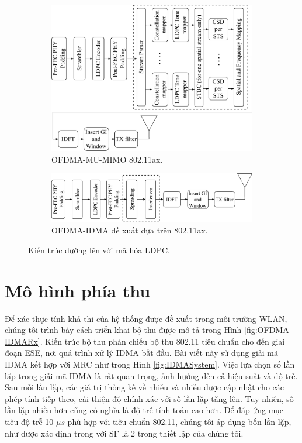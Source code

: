 \begin{figure}
	\centering
	\begin{subfigure}{0.49\linewidth}
		\centering
		\includegraphics[width=1.2\linewidth, angle = -90]{figure/chap3/MU-MIMOTx_k2opt.pdf}
		\caption{OFDMA-MU-MIMO 802.11ax.}
		\label{fig:Old-OFDMA-MU-MIMO}
	\end{subfigure}
	\vspace{1em}
	\begin{subfigure}{0.49\linewidth}
		\centering
		\includegraphics[width=\linewidth, angle = -90]{figure/chap3/IDMA_Tx_Rx_structure-Trang-4_k2opt.pdf}
		\caption{OFDMA-IDMA đề xuất dựa trên 802.11ax.}
		\label{fig:Proposed_OFDMA-IDMA}
	\end{subfigure}

	\caption{Kiến trúc đường lên với mã hóa LDPC.}
	\label{fig:Transmitter}
\end{figure}
\section{Mô hình phía thu}

Để xác thực tính khả thi của hệ thống được đề xuất trong môi trường WLAN, chúng tôi trình bày cách triển khai bộ thu được mô tả trong Hình \ref{fig:OFDMA-IDMARx}. Kiến trúc bộ thu phản chiếu bộ thu 802.11 tiêu chuẩn cho đến giai đoạn ESE, nơi quá trình xử lý IDMA bắt đầu. Bài viết này sử dụng giải mã IDMA kết hợp với MRC như trong Hình \ref{fig:IDMASystem}. Việc lựa chọn số lần lặp trong giải mã IDMA là rất quan trọng, ảnh hưởng đến cả hiệu suất và độ trễ. Sau mỗi lần lặp, các giá trị thống kê về nhiễu và nhiễu được cập nhật cho các phép tính tiếp theo, cải thiện độ chính xác với số lần lặp tăng lên. Tuy nhiên, số lần lặp nhiều hơn cũng có nghĩa là độ trễ tính toán cao hơn. Để đáp ứng mục tiêu độ trễ 10 $\mu s$ phù hợp với tiêu chuẩn 802.11, chúng tôi áp dụng bốn lần lặp, như được xác định trong \cite{UL-OFDM-IDMA} với SF là 2 trong thiết lập của chúng tôi.

